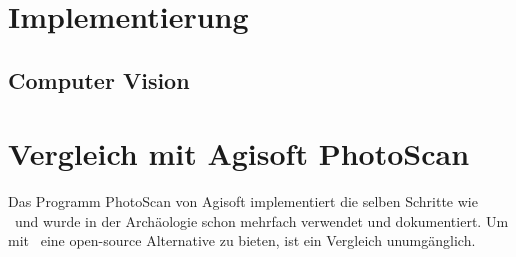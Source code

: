 \chapter{Implementierung} \label{app:imp}
	\section{Computer Vision} \label{app:imp:comp_vis}
	
\chapter{Vergleich mit Agisoft PhotoScan}
	Das Programm PhotoScan von Agisoft implementiert die selben Schritte wie \dronarch\ und wurde in der Archäologie schon mehrfach verwendet und dokumentiert. Um mit \dronarch\ eine open-source Alternative zu bieten, ist ein Vergleich unumgänglich.
	